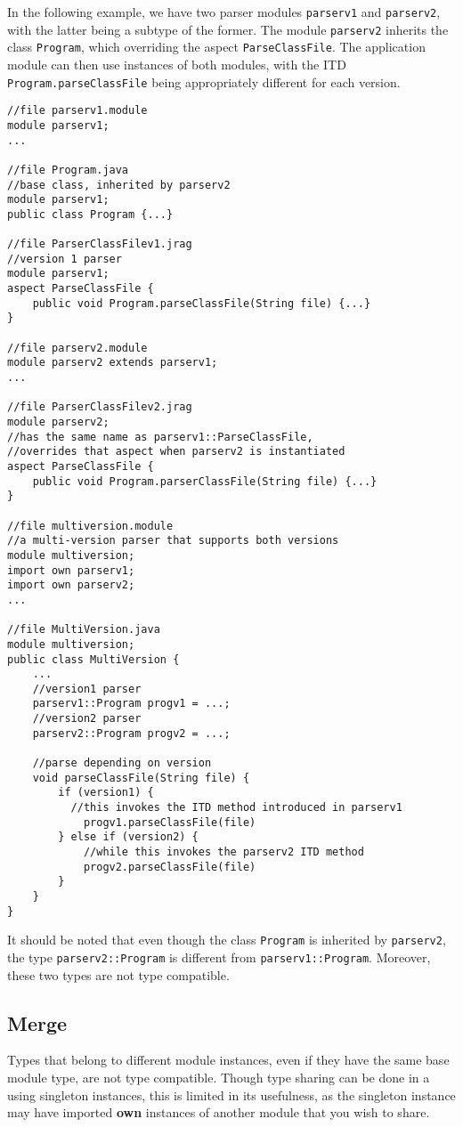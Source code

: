 In the following example, we have two parser modules \texttt{parserv1} and \texttt{parserv2},
with the latter being a subtype of the former. The module \texttt{parserv2} inherits
the class \texttt{Program}, which overriding the aspect \texttt{ParseClassFile}. The
application module can then use instances of both modules, with the ITD \texttt{Program.parseClassFile}
being appropriately different for each version.

\begin{lstlisting}
//file parserv1.module
module parserv1;
...

//file Program.java
//base class, inherited by parserv2
module parserv1;
public class Program {...}

//file ParserClassFilev1.jrag
//version 1 parser
module parserv1;
aspect ParseClassFile {
	public void Program.parseClassFile(String file) {...}
}

//file parserv2.module
module parserv2 extends parserv1;
...

//file ParserClassFilev2.jrag
module parserv2;
//has the same name as parserv1::ParseClassFile, 
//overrides that aspect when parserv2 is instantiated
aspect ParseClassFile {
	public void Program.parserClassFile(String file) {...}
}

//file multiversion.module
//a multi-version parser that supports both versions
module multiversion;
import own parserv1;
import own parserv2;
...

//file MultiVersion.java
module multiversion;
public class MultiVersion {
	...
	//version1 parser
	parserv1::Program progv1 = ...;
	//version2 parser
	parserv2::Program progv2 = ...;
	
	//parse depending on version
	void parseClassFile(String file) {
		if (version1) {
		  //this invokes the ITD method introduced in parserv1
			progv1.parseClassFile(file)
		} else if (version2) {
			//while this invokes the parserv2 ITD method
			progv2.parseClassFile(file)
		}
	}
}
\end{lstlisting}

It should be noted that even though the class \texttt{Program}
is inherited by \texttt{parserv2}, the type
\texttt{parserv2::Program} is different from \texttt{parserv1::Program}. Moreover,
these two types are not type compatible.

\subsection{Merge}

Types that belong to different module instances, even if they have the same
base module type, are not type compatible. Though type sharing can be done
in a using singleton instances, this is limited in its usefulness, as the singleton
instance may have imported \textbf{own} instances of another module that you wish to
share.


